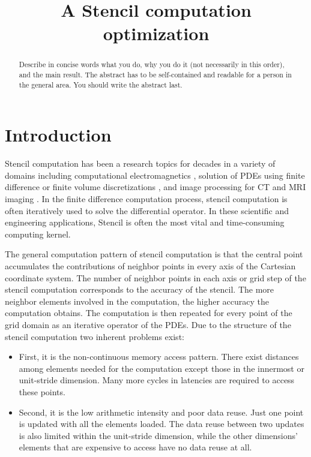 \documentclass[conference]{IEEEtran}
\begin{document}
\title{A Stencil computation optimization}


\author{
}

\maketitle

\begin{abstract}
Describe in concise words what you do, why you do it (not necessarily
in this order), and the main result.  The abstract has to be
self-contained and readable for a person in the general area. You
should write the abstract last.
\end{abstract}

\section{Introduction}\label{sec:intro}

Stencil computation has been a research topics for decades in a variety of domains including computational electromagnetics \cite{taflove}, solution of PDEs using finite difference or finite volume discretizations \cite{smith}, and image processing for CT and MRI imaging \cite{cong-huang-zou}\cite{cong-zou}. In the finite difference computation process, stencil computation is often iteratively used to solve the differential operator. In these scientific and engineering applications, Stencil is often the most vital and time-consuming computing kernel.\cite{su-zhang-mei}

The general computation pattern of stencil computation is that the central point accumulates the contributions of neighbor points in every axis of the Cartesian coordinate system.\cite{su-zhang-mei} The number of neighbor points in each axis or grid step of the stencil computation corresponds to the accuracy of the stencil. The more neighbor elements involved in the computation, the higher accuracy the computation obtains. The computation is then repeated for every point of the grid domain as an iterative operator of the PDEs. Due to the structure of the stencil computation two inherent problems exist:
\begin{itemize}
	\item First, it is the non-continuous memory access pattern. There exist distances among elements needed for the computation except those in the innermost or unit-stride dimension. Many more cycles in latencies are required to access these points. 
	\item Second, it is the low arithmetic intensity and poor data reuse. Just one point is updated with all the elements loaded. The data reuse between two updates is also limited within the unit-stride dimension, while the other dimensions' elements that are expensive to access have no data reuse at all.
\end{itemize}
\end{document}
